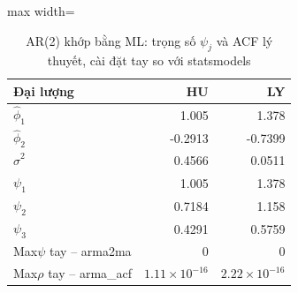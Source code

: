 \begin{table}[H]
\centering\small
\caption{AR(2) khớp bằng ML: trọng số $\psi_j$ và ACF lý thuyết, cài đặt tay so với statsmodels}\label{tab:tab_b11_05_psi_acf}
\begin{adjustbox}{max width=\linewidth}
\begin{tabular}{lrr}
\toprule
Đại lượng & HU & LY \\
\midrule
$\hat{\phi}_{1}$ & 1.005 & 1.378 \\
$\hat{\phi}_{2}$ & -0.2913 & -0.7399 \\
$\hat{\sigma}^{2}$ & 0.4566 & 0.0511 \\
$\psi_{1}$ & 1.005 & 1.378 \\
$\psi_{2}$ & 0.7184 & 1.158 \\
$\psi_{3}$ & 0.4291 & 0.5759 \\
Max\textbar{}$\psi$ tay – arma2ma\textbar{} & 0 & 0 \\
Max\textbar{}$\rho$ tay – arma\_acf\textbar{} & $1.11\times10^{-16}$ & $2.22\times10^{-16}$ \\
\bottomrule
\end{tabular}
\end{adjustbox}
\end{table}
